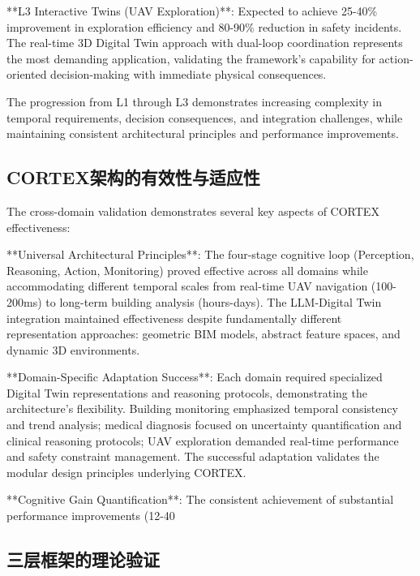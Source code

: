 **L3 Interactive Twins (UAV Exploration)**: Expected to achieve 25-40\% improvement in exploration efficiency and 80-90\% reduction in safety incidents. The real-time 3D Digital Twin approach with dual-loop coordination represents the most demanding application, validating the framework's capability for action-oriented decision-making with immediate physical consequences.

The progression from L1 through L3 demonstrates increasing complexity in temporal requirements, decision consequences, and integration challenges, while maintaining consistent architectural principles and performance improvements.

\subsection{CORTEX架构的有效性与适应性}

The cross-domain validation demonstrates several key aspects of CORTEX effectiveness:

**Universal Architectural Principles**: The four-stage cognitive loop (Perception, Reasoning, Action, Monitoring) proved effective across all domains while accommodating different temporal scales from real-time UAV navigation (100-200ms) to long-term building analysis (hours-days). The LLM-Digital Twin integration maintained effectiveness despite fundamentally different representation approaches: geometric BIM models, abstract feature spaces, and dynamic 3D environments.

**Domain-Specific Adaptation Success**: Each domain required specialized Digital Twin representations and reasoning protocols, demonstrating the architecture's flexibility. Building monitoring emphasized temporal consistency and trend analysis; medical diagnosis focused on uncertainty quantification and clinical reasoning protocols; UAV exploration demanded real-time performance and safety constraint management. The successful adaptation validates the modular design principles underlying CORTEX.

**Cognitive Gain Quantification**: The consistent achievement of substantial performance improvements (12-40%

\subsection{三层框架的理论验证}

